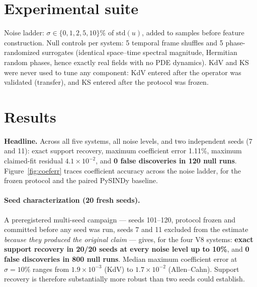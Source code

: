 \documentclass[11pt]{article}
\begin{document}
\section{Experimental suite}
\label{sec:suite}
\begin{center}
\end{center}

Noise ladder: $\sigma \in \{0, 1, 2, 5, 10\}\%$ of $\mathrm{std}(u)$, added
to samples before feature construction. Null controls per system: 5 temporal
frame shuffles and 5 phase-randomized surrogates (identical space--time
spectral magnitude, Hermitian random phases, hence exactly real fields with
no PDE dynamics). KdV and KS were never used to tune any component: KdV
entered after the operator was validated (transfer), and KS entered after
the protocol was frozen.

\section{Results}
\textbf{Headline.} Across all five systems, all noise levels, and
two independent seeds (7 and 11): exact support recovery, maximum coefficient error
1.11\%, maximum claimed-fit residual $4.1 \times 10^{-2}$, and \textbf{0 false
discoveries in 120 null runs}. Figure~\ref{fig:coeferr} traces
coefficient accuracy across the noise ladder, for the frozen protocol and
the paired PySINDy baseline.

\paragraph{Seed characterization (20 fresh seeds).} A preregistered
multi-seed campaign --- seeds 101--120, protocol frozen and committed
before any seed was run, seeds 7 and 11 excluded from the estimate
\emph{because they produced the original claim} --- gives, for the four
V8 systems: \textbf{exact support recovery in 20/20 seeds at every noise
level up to 10\%}, and \textbf{0 false discoveries in 800 null runs}.
Median maximum coefficient error at $\sigma = 10\%$ ranges from
$1.9 \times 10^{-3}$ (KdV) to $1.7 \times 10^{-2}$ (Allen--Cahn).
Support recovery is therefore substantially more robust than two seeds
could establish.
\end{document}

